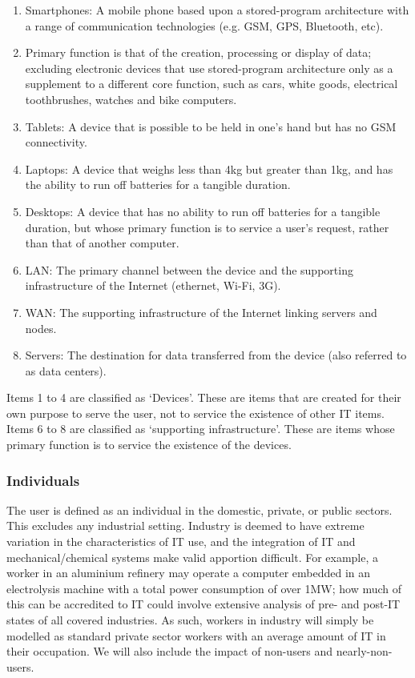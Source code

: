 \documentclass[conference]{IEEEtran}
\begin{document}
\begin{enumerate}
\item Smartphones: A mobile phone based upon a stored-program
  architecture with a range of communication technologies (e.g. GSM, GPS,
  Bluetooth, etc).
\item Primary function is that of the creation, processing or display
  of data; excluding electronic devices that use stored-program
  architecture only as a supplement to a different core function, such
  as cars, white goods, electrical toothbrushes, watches and bike
  computers.
\item Tablets: A device that is possible to be held in one’s hand but
  has no GSM connectivity.
\item Laptops: A device that weighs less than 4kg but greater
  than 1kg, and has the ability to run off batteries for a
  tangible duration.
\item Desktops: A device that has no ability to run off batteries for
  a tangible duration, but whose primary function is to service a
  user’s request, rather than that of another computer.
\item LAN: The primary channel between the device and the supporting
  infrastructure of the Internet (ethernet, Wi-Fi, 3G).
\item WAN: The supporting infrastructure of the Internet linking
  servers and nodes.
\item Servers: The destination for data transferred from the device
  (also referred to as data centers).
\end{enumerate}

Items 1 to 4 are classified as ‘Devices’. These are items that are
created for their own purpose to serve the user, not to service the
existence of other IT items. Items 6 to 8 are classified as
‘supporting infrastructure’. These are items whose primary function is
to service the existence of the devices.

\subsubsection{Individuals}

The user is defined as an individual in the domestic, private, or
public sectors. This excludes any industrial setting. Industry is
deemed to have extreme variation in the characteristics of IT use, and
the integration of IT and mechanical/chemical systems make valid
apportion difficult. For example, a worker in an aluminium refinery
may operate a computer embedded in an electrolysis machine with a
total power consumption of over 1MW; how much of this can be
accredited to IT could involve extensive analysis of pre- and post-IT
states of all covered industries. As such, workers in industry will
simply be modelled as standard private sector workers with an average
amount of IT in their occupation. We will also include the impact of
non-users and nearly-non-users.
\end{document}
